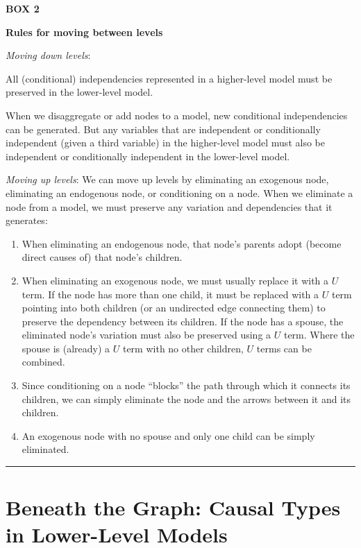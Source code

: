 \documentclass[12pt,]{book}
\providecommand{\tightlist}{%
  \setlength{\itemsep}{0pt}\setlength{\parskip}{0pt}}
\begin{document}
\textbf{BOX 2}

\textbf{Rules for moving between levels}

\emph{Moving down levels}:

All (conditional) independencies represented in a higher-level model must be preserved in the lower-level model.

When we disaggregate or add nodes to a model, new conditional independencies can be generated. But any variables that are independent or conditionally independent (given a third variable) in the higher-level model must also be independent or conditionally independent in the lower-level model.

\emph{Moving up levels}: We can move up levels by eliminating an exogenous node, eliminating an endogenous node, or conditioning on a node. When we eliminate a node from a model, we must preserve any variation and dependencies that it generates:

\begin{enumerate}
\def\labelenumi{\arabic{enumi}.}
\tightlist
\item
  When eliminating an endogenous node, that node's parents adopt (become direct causes of) that node's children.
\item
  When eliminating an exogenous node, we must usually replace it with a \(U\) term. If the node has more than one child, it must be replaced with a \(U\) term pointing into both children (or an undirected edge connecting them) to preserve the dependency between its children. If the node has a spouse, the eliminated node's variation must also be preserved using a \(U\) term. Where the spouse is (already) a \(U\) term with no other children, \(U\) terms can be combined.\\
\item
  Since conditioning on a node ``blocks'' the path through which it connects its children, we can simply eliminate the node and the arrows between it and its children.
\item
  An exogenous node with no spouse and only one child can be simply eliminated.
\end{enumerate}

\begin{center}\rule{0.5\linewidth}{\linethickness}\end{center}

\hypertarget{beneath-the-graph-causal-types-in-lower-level-models}{%
\section{Beneath the Graph: Causal Types in Lower-Level Models}\label{beneath-the-graph-causal-types-in-lower-level-models}}
\end{document}
